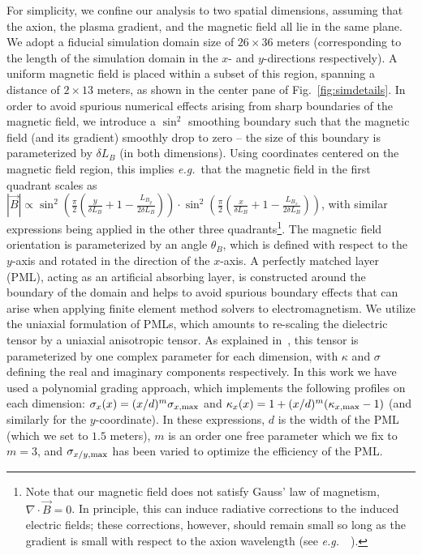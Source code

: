 \documentclass[twocolumn,superscriptaddress,floatfix,preprintnumbers,prd,nofootinbib,aps,10pt]{revtex4-2}
\renewcommand\({\left(}
\renewcommand\){\right)}
\renewcommand\[{\left[}
\renewcommand\]{\right]}
\newcommand\eg{{\it e.g.}~}
\newcommand{\sjw}[1]{{\color{red}#1}}
\begin{document}
For simplicity, we confine our analysis to two spatial dimensions, assuming that the axion, the plasma gradient, and the magnetic field all lie in the same plane. We adopt a fiducial simulation domain size of $26 \times 36$ meters (corresponding to the length of the simulation domain in the $x$- and $y$-directions respectively). A uniform magnetic field is placed within a subset of this region, spanning a distance of $2 \times 13$ meters, as shown in the center pane of Fig.~\ref{fig:simdetails}. In order to avoid spurious numerical effects arising from sharp boundaries of the magnetic field, we introduce a $\sin^2$ smoothing boundary such that the magnetic field (and its gradient) smoothly drop to zero -- the size of this boundary is parameterized by $\delta L_B$ (in both dimensions). Using coordinates centered on the magnetic field region, this implies \eg that the magnetic field in the first quadrant scales as $|\vec{B}| \propto \sin^2(\frac{\pi}{2} (\frac{y}{\delta L_B} + 1 - \frac{L_{B_y}}{2 \delta L_B})) \cdot \sin^2(\frac{\pi}{2} (\frac{x}{\delta L_B} + 1 - \frac{L_{B_x}}{2 \delta L_B}))$, with similar expressions being applied in the other three quadrants\footnote{Note that our magnetic field does not satisfy Gauss' law of magnetism, $\nabla \cdot \vec{B} = 0$. In principle, this can induce radiative corrections to the induced electric fields; these corrections, however, should remain small so long as the gradient is small with respect to the axion wavelength (see \eg~\cite{knirck2019first}).}. The magnetic field orientation is parameterized by an angle $\theta_B$, which is defined with respect to the $y$-axis and rotated in the direction of the $x$-axis. A perfectly matched layer (PML), acting as an artificial absorbing layer, is constructed around the boundary of the domain and helps to avoid spurious boundary effects that can arise when applying finite element method solvers to electromagnetism. We utilize the uniaxial formulation of PMLs, which amounts to re-scaling the dielectric tensor by a uniaxial anisotropic tensor. As explained in~\cite{taf05}, this tensor is parameterized by one complex parameter for each dimension, with $\kappa$ and $\sigma$ defining the real and imaginary components respectively. In this work we have used a polynomial grading approach, which implements the following profiles on each dimension: $\sigma_x(x) = (x/d)^m \sigma_{x, \rm max}$ and $\kappa_x(x) = 1 + (x/d)^m(\kappa_{x, \rm max} - 1)$ (and similarly for the $y$-coordinate). In these expressions, $d$ is the width of the PML (which we set to $1.5$ meters), $m$ is an order one free parameter which we fix to $m = 3$, and $\sigma_{x/y, \rm max}$ has been varied to optimize the efficiency of the PML. %
\end{document}
